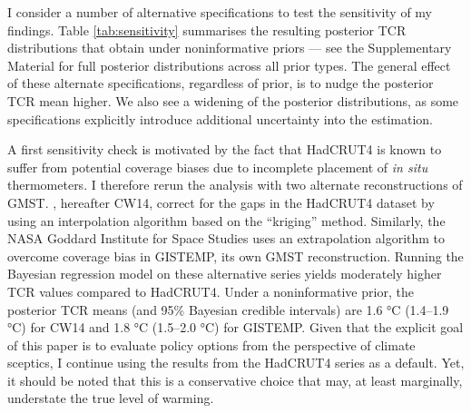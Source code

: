 \documentclass[smallextended]{svjour3}       %
\begin{document}
I consider a number of alternative specifications to test the
sensitivity of my findings. Table \ref{tab:sensitivity} summarises the
resulting posterior TCR distributions that obtain under noninformative
priors --- see the Supplementary Material for full posterior
distributions across all prior types. The general effect of these
alternate specifications, regardless of prior, is to nudge the posterior
TCR mean higher. We also see a widening of the posterior distributions,
as some specifications explicitly introduce additional uncertainty into
the estimation.

A first sensitivity check is motivated by the fact that HadCRUT4 is
known to suffer from potential coverage biases due to incomplete
placement of \textit{in situ} thermometers. I therefore rerun the
analysis with two alternate reconstructions of GMST.
\cite{cowtan2014coverage}, hereafter CW14, correct for the gaps in the
HadCRUT4 dataset by using an interpolation algorithm based on the
``kriging'' method. Similarly, the NASA Goddard Institute for Space
Studies uses an extrapolation algorithm to overcome coverage bias in
GISTEMP, its own GMST reconstruction. Running the Bayesian regression
model on these alternative series yields moderately higher TCR values
compared to HadCRUT4. Under a noninformative prior, the posterior TCR
means (and 95\% Bayesian credible intervals) are 1.6 °C (1.4--1.9 °C)
for CW14 and 1.8 °C (1.5--2.0 °C) for GISTEMP. Given that the explicit
goal of this paper is to evaluate policy options from the perspective of
climate sceptics, I continue using the results from the HadCRUT4 series
as a default. Yet, it should be noted that this is a conservative choice
that may, at least marginally, understate the true level of warming.
\end{document}
